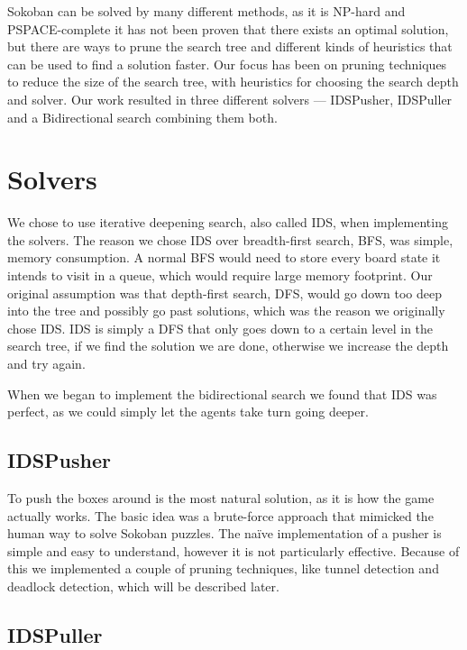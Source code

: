 \documentclass[a4paper,11pt]{article}
\renewcommand{\*}[0]{\cdot}
\begin{document}

Sokoban can be solved by many different methods, as it is NP-hard and
PSPACE-complete it has not been proven that there exists an optimal solution,
but there are ways to prune the search tree and different kinds of heuristics
that can be used to find a solution faster. Our focus has been on pruning
techniques to reduce the size of the search tree, with heuristics for choosing
the search depth and solver. Our work resulted in three different solvers ---
IDSPusher, IDSPuller and a Bidirectional search combining them both.


\section{Solvers}

We chose to use iterative deepening search, also called IDS, when
implementing the solvers. The reason we chose IDS over breadth-first search,
BFS, was simple, memory consumption. A normal BFS would need to store every
board state it intends to visit in a queue, which would require large memory
footprint. Our original assumption was that depth-first search, DFS, would go
down too deep into the tree and possibly go past solutions, which was the
reason we originally chose IDS. IDS is simply a DFS that only goes down to a
certain level in the search tree, if we find the solution we are done, otherwise we
increase the depth and try again.

When we began to implement the bidirectional search we found that IDS was
perfect, as we could simply let the agents take turn going deeper.

\subsection{IDSPusher}

To push the boxes around is the most natural solution, as it is how the game
actually works. The basic idea was a brute-force approach that mimicked the
human way to solve Sokoban puzzles. The naïve implementation of a pusher is
simple and easy to understand, however it is not particularly effective.
Because of this we implemented a couple of pruning techniques, like tunnel
detection and deadlock detection, which will be described later.

\subsection{IDSPuller}
\end{document}
